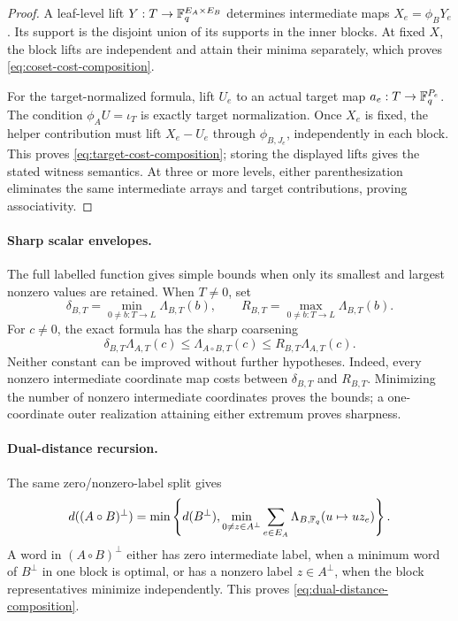 \begin{proof}
A leaf-level lift $Y:T\to\mathbb F_q^{E_A\times E_B}$ determines intermediate maps
$X_e=\phi_BY_e$.  Its support is the disjoint union of its supports in the
inner blocks.  At fixed $X$, the block lifts are independent and attain their
minima separately, which proves \eqref{eq:coset-cost-composition}.

For the target-normalized formula, lift $U_e$ to an actual target map
$a_e:T\to\mathbb F_q^{P_e}$.  The condition $\phi_AU=\iota_T$ is exactly target
normalization.  Once $X_e$ is fixed, the helper contribution must lift
$X_e-U_e$ through $\phi_{B,J_e}$, independently in each block.  This proves
\eqref{eq:target-cost-composition}; storing the displayed lifts gives the
stated witness semantics.  At three or more levels, either parenthesization
eliminates the same intermediate arrays and target contributions, proving
associativity.
%
%
\end{proof}

\paragraph{Sharp scalar envelopes.}
The full labelled function gives simple bounds when only its smallest and
largest nonzero values are retained.  When $T\ne0$, set
\[
 \delta_{B,T}=\min_{0\ne b:T\to L}\Lambda_{B,T}(b),
 \qquad
 R_{B,T}=\max_{0\ne b:T\to L}\Lambda_{B,T}(b).
\]
For $c\ne0$, the exact formula has the sharp coarsening
\begin{equation}
 \delta_{B,T}\Lambda_{A,T}(c)
 \leq \Lambda_{A\circ B,T}(c)
 \leq R_{B,T}\Lambda_{A,T}(c).
 \label{eq:coset-cost-envelope}
\end{equation}
Neither constant can be improved without further hypotheses.
Indeed, every nonzero intermediate coordinate map costs between
$\delta_{B,T}$ and $R_{B,T}$.  Minimizing the number of nonzero intermediate
coordinates proves the bounds; a one-coordinate outer realization attaining
either extremum proves sharpness.

\paragraph{Dual-distance recursion.}
The same zero/nonzero-label split gives
\begin{equation}
 d((A\circ B)^\perp)=
 \min\left\{
 d(B^\perp),
 \min_{0\ne z\in A^\perp}
 \sum_{e\in E_A}\Lambda_{B,\mathbb F_q}(u\mapsto uz_e)
 \right\}.
 \label{eq:dual-distance-composition}
\end{equation}
A word in $(A\circ B)^\perp$ either has zero intermediate label, when a
minimum word of $B^\perp$ in one block is optimal, or has a nonzero label
$z\in A^\perp$, when the block representatives minimize independently.  This
proves \eqref{eq:dual-distance-composition}.

